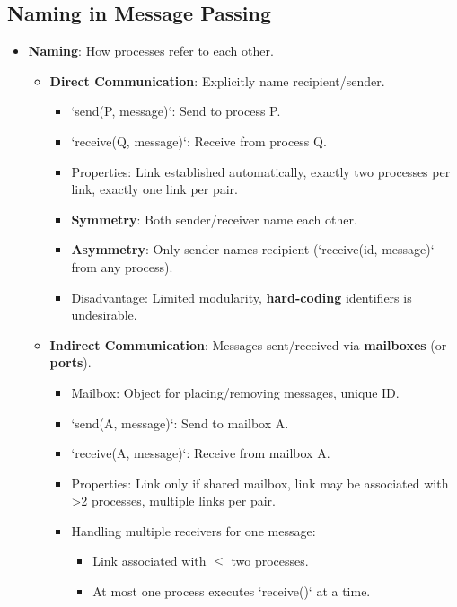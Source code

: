 \subsection{Naming in Message Passing}
\begin{itemize}
    \item \textbf{Naming}: How processes refer to each other.
        \begin{itemize}
            \item \textbf{Direct Communication}: Explicitly name recipient/sender.
                \begin{itemize}
                    \item `send(P, message)`: Send to process P.
                    \item `receive(Q, message)`: Receive from process Q.
                    \item Properties: Link established automatically, exactly two processes per link, exactly one link per pair.
                    \item \textbf{Symmetry}: Both sender/receiver name each other.
                    \item \textbf{Asymmetry}: Only sender names recipient (`receive(id, message)` from any process).
                    \item Disadvantage: Limited modularity, \textbf{hard-coding} identifiers is undesirable.
                \end{itemize}
            \item \textbf{Indirect Communication}: Messages sent/received via \textbf{mailboxes} (or \textbf{ports}).
                \begin{itemize}
                    \item Mailbox: Object for placing/removing messages, unique ID.
                    \item `send(A, message)`: Send to mailbox A.
                    \item `receive(A, message)`: Receive from mailbox A.
                    \item Properties: Link only if shared mailbox, link may be associated with >2 processes, multiple links per pair.
                    \item Handling multiple receivers for one message:
                        \begin{itemize}
                            \item Link associated with $\le$ two processes.
                            \item At most one process executes `receive()` at a time.

\end{itemize}
\end{itemize}
\end{itemize}
\end{itemize}
